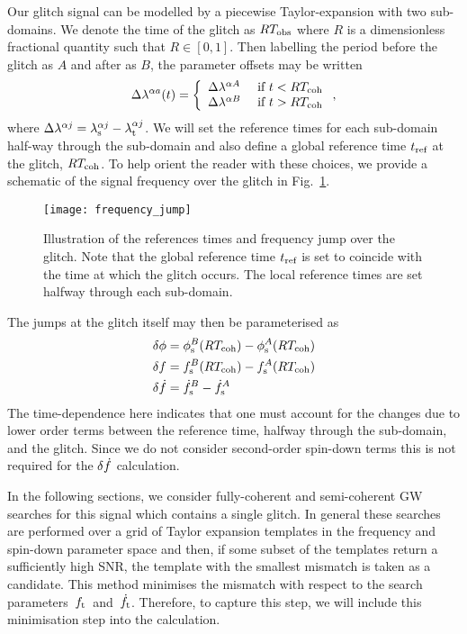 \documentclass[../full_thesis/full_thesis.tex]{subfiles}
\begin{document}
Our glitch signal can be modelled by a piecewise Taylor-expansion with two
sub-domains. We denote the time of the glitch as $RT_{\mathrm{obs}}$ where $R$
is a dimensionless fractional quantity such that $R\in[0, 1]$.
Then labelling the period before the glitch as $A$ and after as
$B$, the parameter offsets may be written
\begin{align}
\Delta\lambda^{\alpha a}(t) = \left\{
\begin{array}{lc}
\Delta\lambda^{\alpha A} & \textrm{ if } t < RT_{\mathrm{coh}}\\
\Delta\lambda^{\alpha B} & \textrm{ if } t > RT_{\mathrm{coh}}
\end{array}
\right.,
\label{eqn: delta lambda alpha glitch}
\end{align}
where $\Delta\lambda^{\alpha j} = {\lambda}_\textrm{s}^{\alpha j} - {\lambda}_\textrm{t}^{\alpha j}$. We will set the
reference times for each sub-domain half-way through the sub-domain and also define a global
reference time $t_{\textrm{ref}}$ at the glitch, $RT_{\mathrm{coh}}$. To help orient the reader with
these choices, we provide a schematic of the signal frequency over the glitch
in Fig.~\ref{fig: frequency jump}.
\begin{figure}[htb]
\centering
\texttt{[image: frequency\_jump]}
\caption{Illustration of the references times and frequency jump over the glitch.
Note that the global reference time $t_{\textrm{ref}}$ is set to coincide with the time
at which the glitch occurs. The local reference times are set halfway through
each sub-domain.}
\label{fig: frequency jump}
\end{figure}

The jumps at the glitch itself may then be parameterised as
\begin{align}
\begin{split}
\delta\phi & =  \phi_{\textrm{s}}^{B}(RT_{\mathrm{coh}}) - \phi_{\textrm{s}}^{A}(RT_{\mathrm{coh}})\\
\delta f & =  f_{\textrm{s}}^{B}(RT_{\mathrm{coh}}) - f_{\textrm{s}}^{A}(RT_{\mathrm{coh}})\\
\delta\dot{f} & =  \dot{f}_{\textrm{s}}^{B} - \dot{f}_{\textrm{s}}^{A}
\end{split}
\label{eqn: glitch jumps}
\end{align}
The time-dependence here indicates that one must account for the
changes due to lower order terms between the reference time, halfway through
the sub-domain, and the glitch. Since we do not consider second-order spin-down
terms this is not required for the $\delta\dot{f}$ calculation.

In the following sections, we consider fully-coherent and semi-coherent GW
searches for this signal which contains a single glitch. In general these
searches are performed over a grid of Taylor expansion templates in the
frequency and spin-down parameter space and then, if some subset of the
templates return a sufficiently high SNR, the template with the smallest
mismatch is taken as a candidate. This method minimises the mismatch with
respect to the search parameters~${f_{\textrm{t}}}$~and~$\dot{f}_{\textrm{t}}$. Therefore, to capture
this step, we will include this minimisation step into the calculation.
\end{document}
